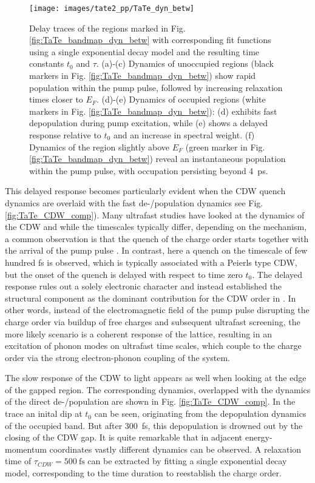 \begin{figure}[t]
	\centering
	\texttt{[image: images/tate2\_pp/TaTe\_dyn\_betw]}
	\caption{Delay traces of the regions marked in Fig. \ref{fig:TaTe_bandmap_dyn_betw} with corresponding fit functions using a single exponential decay model and the resulting time constants $t_0$ and $\tau$. (a)-(c) Dynamics of unoccupied regions (black markers in Fig. \ref{fig:TaTe_bandmap_dyn_betw}) show rapid population within the pump pulse, followed by increasing relaxation times closer to $E_F$. (d)-(e) Dynamics of occupied regions (white markers in Fig. \ref{fig:TaTe_bandmap_dyn_betw}): (d) exhibits fast depopulation during pump excitation, while (e) shows a delayed response relative to $t_0$ and an increase in spectral weight. (f) Dynamics of the region slightly above $E_F$ (green marker in Fig. \ref{fig:TaTe_bandmap_dyn_betw}) reveal an instantaneous population within the pump pulse, with occupation persisting beyond \qty{4}{\pico\second}.}
	\label{fig:TaTe_dyn_betw}
\end{figure}


This delayed response becomes particularly evident when the CDW quench dynamics are overlaid with the fast de-/population dynamics see Fig. \ref{fig:TaTe_CDW_comp}).
Many ultrafast studies have looked at the dynamics of the CDW and while the timescales typically differ, depending on the mechanism, a common observation is that the quench of the charge order starts together with the arrival of the pump pulse \cite{perfetti_time_2006, rohwer_collapse_2011, rettig_coherent_2014, shi_ultrafast_2019, maklar_nonequilibrium_2021, maklar_coherent_2022, huber_mapping_2022, huber_revealing_2022, maklar_coherent_2023, huber_ultrafast_2024}.
In contrast, here a quench on the timescale of few hundred \unit{\femto\second} is observed, which is typically associated with a Peierls type CDW, but the onset of the quench is delayed with respect to time zero $t_0$.
The delayed response rules out a solely electronic character and instead established the structural component as the dominant contribution for the CDW order in .
In other words, instead of the electromagnetic field of the pump pulse disrupting the charge order via buildup of free charges and subsequent ultrafast screening, the more likely scenario is a coherent response of the lattice, resulting in an excitation of phonon modes on ultrafast time scales, which couple to the charge order via the strong electron-phonon coupling of the system.

The slow response of the CDW to light appears as well when looking at the edge of the gapped region.
The corresponding dynamics, overlapped with the dynamics of the direct de-/population are shown in Fig. \ref{fig:TaTe_CDW_comp}.
In the trace an inital dip at $t_0$ can be seen, originating from the depopulation dynamics of the occupied band.
But after \qty{300}{\femto\second}, this depopulation is drowned out by the closing of the CDW gap.
It is quite remarkable that in adjacent energy-momentum coordinates vastly different dynamics can be observed.
A relaxation time of $\tau_{CDW}=\qty{500}{\femto\second}$ can be extracted by fitting a single exponential decay model, corresponding to the time duration to reestablish the charge order.


